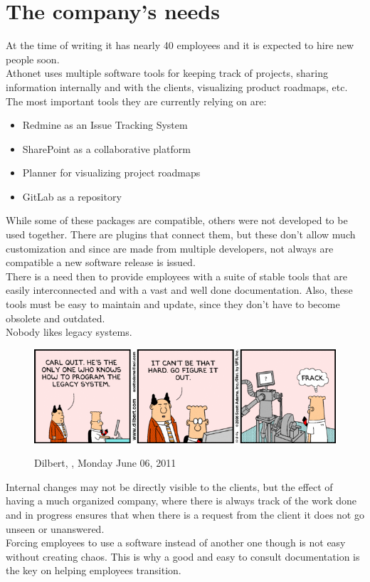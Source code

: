 \section{The company's needs}
	At the time of writing it has nearly 40 employees and it is expected to hire new people soon.\\
	Athonet uses multiple software tools for keeping track of projects, sharing information internally and with the clients, visualizing product roadmaps, etc.\\
	The most important tools they are currently relying on are:
	\begin{itemize}
		\item Redmine as an Issue Tracking System
		\item SharePoint as a collaborative platform
		\item Planner for visualizing project roadmaps
		\item GitLab as a repository
	\end{itemize}
	While some of these packages are compatible, others were not developed to be used together.
	There are plugins that connect them, but these don't allow much customization and since are made from multiple developers, not always are compatible  a new software release is issued.\\
	There is a need then to provide employees with a suite of stable tools that are easily interconnected and with a vast and well done documentation.
	Also, these tools must be easy to maintain and update, since they don't have to become obsolete and outdated.\\
	Nobody likes legacy systems.
	\begin{figure}[H]
		\centering
		\includegraphics[width=1\textwidth]{resources/legacy-code}\\
		\caption[Dilbert, ]{Dilbert, , Monday June 06, 2011}
	\end{figure}
	Internal changes may not be directly visible to the clients, but the effect of having a much organized company, where there is always track of the work done and in progress ensures that when there is a request from the client it does not go unseen or unanswered.\\
	Forcing employees to use a software instead of another one though is not easy without creating chaos.
	This is why a good and easy to consult documentation is the key on helping employees transition.

